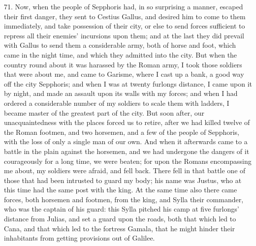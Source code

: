 71. Now, when the people of Sepphoris had, in so surprising a manner,
escaped their first danger, they sent to Cestius Gallus, and desired him
to come to them immediately, and take possession of their city, or else to
send forces sufficient to repress all their enemies' incursions upon them;
and at the last they did prevail with Gallus to send them a considerable
army, both of horse and foot, which came in the night time, and which they
admitted into the city. But when the country round about it was harassed
by the Roman army, I took those soldiers that were about me, and came to
Garisme, where I cast up a bank, a good way off the city Sepphoris; and
when I was at twenty furlongs distance, I came upon it by night, and made
an assault upon its walls with my forces; and when I had ordered a
considerable number of my soldiers to scale them with ladders, I became
master of the greatest part of the city. But soon after, our
unacquaintedness with the places forced us to retire, after we had killed
twelve of the Roman footmen, and two horsemen, and a few of the people of
Sepphoris, with the loss of only a single man of our own. And when it
afterwards came to a battle in the plain against the horsemen, and we had
undergone the dangers of it courageously for a long time, we were beaten;
for upon the Romans encompassing me about, my soldiers were afraid, and
fell back. There fell in that battle one of those that had been intrusted
to guard my body; his name was Justus, who at this time had the same post
with the king. At the same time also there came forces, both horsemen and
footmen, from the king, and Sylla their commander, who was the captain of
his guard: this Sylla pitched his camp at five furlongs' distance from
Julias, and set a guard upon the roads, both that which led to Cana, and
that which led to the fortress Gamala, that he might hinder their
inhabitants from getting provisions out of Galilee.

